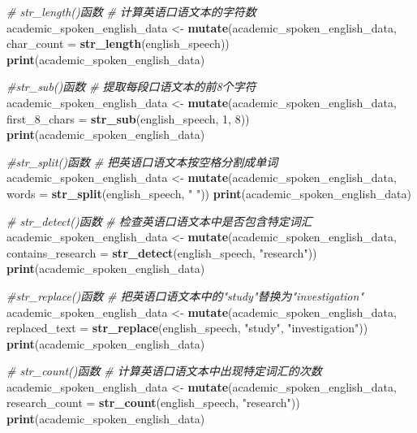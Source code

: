 \documentclass[]{book}
\newenvironment{Shaded}{\begin{snugshade}}{\end{snugshade}}
\newcommand{\CommentTok}[1]{\textcolor[rgb]{0.56,0.35,0.01}{\textit{#1}}}
\newcommand{\DataTypeTok}[1]{\textcolor[rgb]{0.13,0.29,0.53}{#1}}
\newcommand{\DecValTok}[1]{\textcolor[rgb]{0.00,0.00,0.81}{#1}}
\newcommand{\KeywordTok}[1]{\textcolor[rgb]{0.13,0.29,0.53}{\textbf{#1}}}
\newcommand{\NormalTok}[1]{#1}
\newcommand{\StringTok}[1]{\textcolor[rgb]{0.31,0.60,0.02}{#1}}
\begin{document}
\begin{Shaded}
\begin{Highlighting}[]
\CommentTok{# str_length()函数}
\CommentTok{# 计算英语口语文本的字符数}
\NormalTok{academic_spoken_english_data <-}\StringTok{ }\KeywordTok{mutate}\NormalTok{(academic_spoken_english_data, }\DataTypeTok{char_count =} \KeywordTok{str_length}\NormalTok{(english_speech))}
\KeywordTok{print}\NormalTok{(academic_spoken_english_data)}

\CommentTok{#str_sub()函数}
\CommentTok{# 提取每段口语文本的前8个字符}
\NormalTok{academic_spoken_english_data <-}\StringTok{ }\KeywordTok{mutate}\NormalTok{(academic_spoken_english_data, }\DataTypeTok{first_8_chars =} \KeywordTok{str_sub}\NormalTok{(english_speech, }\DecValTok{1}\NormalTok{, }\DecValTok{8}\NormalTok{))}
\KeywordTok{print}\NormalTok{(academic_spoken_english_data)}

\CommentTok{#str_split()函数}
\CommentTok{# 把英语口语文本按空格分割成单词}
\NormalTok{academic_spoken_english_data <-}\StringTok{ }\KeywordTok{mutate}\NormalTok{(academic_spoken_english_data, }\DataTypeTok{words =} \KeywordTok{str_split}\NormalTok{(english_speech, }\StringTok{" "}\NormalTok{))}
\KeywordTok{print}\NormalTok{(academic_spoken_english_data)}

\CommentTok{# str_detect()函数}
\CommentTok{# 检查英语口语文本中是否包含特定词汇}
\NormalTok{academic_spoken_english_data <-}\StringTok{ }\KeywordTok{mutate}\NormalTok{(academic_spoken_english_data, }\DataTypeTok{contains_research =} \KeywordTok{str_detect}\NormalTok{(english_speech, }\StringTok{"research"}\NormalTok{))}
\KeywordTok{print}\NormalTok{(academic_spoken_english_data)}

\CommentTok{#str_replace()函数}
\CommentTok{# 把英语口语文本中的"study"替换为"investigation"}
\NormalTok{academic_spoken_english_data <-}\StringTok{ }\KeywordTok{mutate}\NormalTok{(academic_spoken_english_data, }\DataTypeTok{replaced_text =} \KeywordTok{str_replace}\NormalTok{(english_speech, }\StringTok{"study"}\NormalTok{, }\StringTok{"investigation"}\NormalTok{))}
\KeywordTok{print}\NormalTok{(academic_spoken_english_data)}

\CommentTok{# str_count()函数}
\CommentTok{# 计算英语口语文本中出现特定词汇的次数}
\NormalTok{academic_spoken_english_data <-}\StringTok{ }\KeywordTok{mutate}\NormalTok{(academic_spoken_english_data, }\DataTypeTok{research_count =} \KeywordTok{str_count}\NormalTok{(english_speech, }\StringTok{"research"}\NormalTok{))}
\KeywordTok{print}\NormalTok{(academic_spoken_english_data)}


\end{Highlighting}
\end{Shaded}
\end{document}
